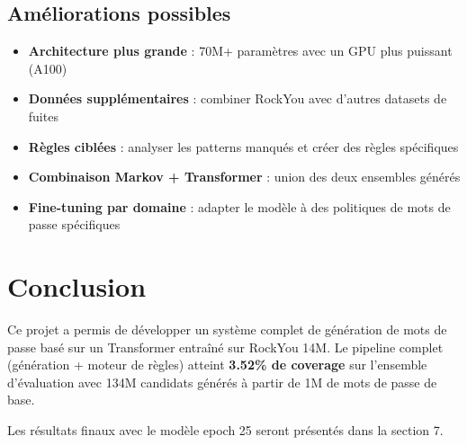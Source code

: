 \documentclass[12pt,a4paper]{article}
\begin{document}
\subsection{Améliorations possibles}

\begin{itemize}
    \item \textbf{Architecture plus grande} : 70M+ paramètres avec un GPU plus puissant (A100)
    \item \textbf{Données supplémentaires} : combiner RockYou avec d'autres datasets de fuites
    \item \textbf{Règles ciblées} : analyser les patterns manqués et créer des règles spécifiques
    \item \textbf{Combinaison Markov + Transformer} : union des deux ensembles générés
    \item \textbf{Fine-tuning par domaine} : adapter le modèle à des politiques de mots de passe spécifiques
\end{itemize}

\section{Conclusion}

Ce projet a permis de développer un système complet de génération de mots de passe basé sur un Transformer entraîné sur RockYou 14M. Le pipeline complet (génération + moteur de règles) atteint \textbf{3.52\% de coverage} sur l'ensemble d'évaluation avec 134M candidats générés à partir de 1M de mots de passe de base.

Les résultats finaux avec le modèle epoch 25 seront présentés dans la section 7.
\end{document}
